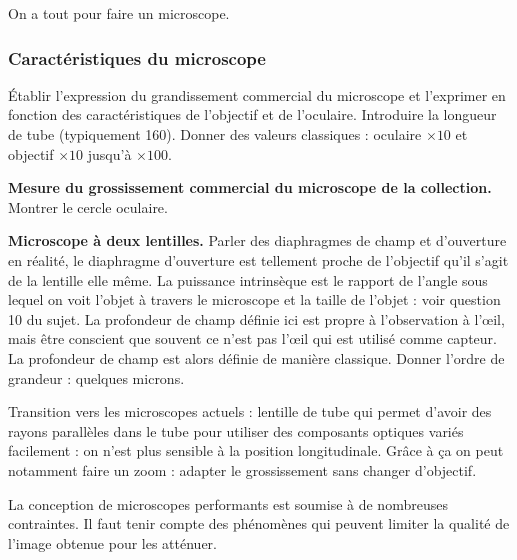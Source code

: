 \begin{transition}
On a tout pour faire un microscope.
\end{transition}

\subsubsection{Caractéristiques du microscope}

Établir l'expression du grandissement commercial du microscope et l'exprimer en fonction des caractéristiques de l'objectif et de l'oculaire.
Introduire la longueur de tube (typiquement \unit{160}{\milli\meter}).
Donner des valeurs classiques : oculaire $\times 10$ et objectif $\times 10$ jusqu'à $\times 100$.

\begin{experience}
\textbf{Mesure du grossissement commercial du microscope de la collection.}
Montrer le cercle oculaire.
\end{experience}

\begin{slide}
\textbf{Microscope à deux lentilles.}
Parler des diaphragmes de champ et d'ouverture en réalité, le diaphragme d'ouverture est tellement proche de l'objectif qu'il s'agit de la lentille elle même.
La puissance intrinsèque est le rapport de l'angle sous lequel on voit l'objet à travers le microscope et la taille de l'objet : voir question 10 du sujet.
La profondeur de champ définie ici est propre à l'observation à l'œil, mais être conscient que souvent ce n'est pas l'œil qui est utilisé comme capteur.
La profondeur de champ est alors définie de manière classique.
Donner l'ordre de grandeur : quelques microns.
\end{slide}

\begin{remarque}
Transition vers les microscopes actuels : lentille de tube qui permet d'avoir des rayons parallèles dans le tube pour utiliser des composants optiques variés facilement : on n'est plus sensible à la position longitudinale.
Grâce à ça on peut notamment faire un zoom : adapter le grossissement sans changer d'objectif.
\end{remarque}

\begin{transition}
La conception de microscopes performants est soumise à de nombreuses contraintes.
Il faut tenir compte des phénomènes qui peuvent limiter la qualité de l'image obtenue pour les atténuer.
\end{transition}

